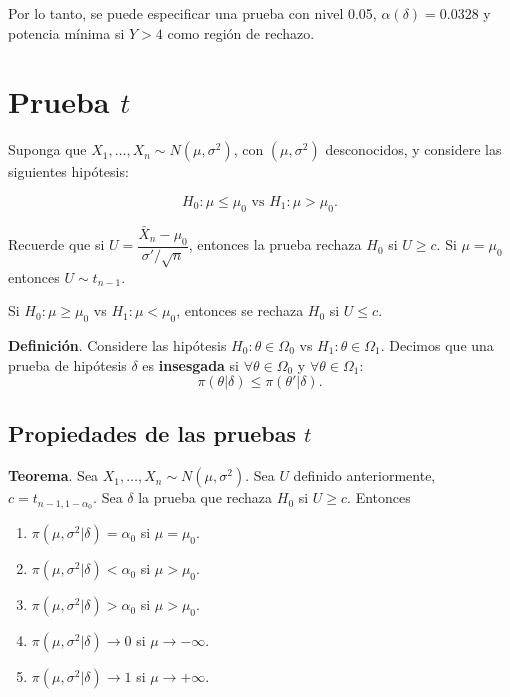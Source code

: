 \documentclass[
  12pt,
]{book}
\begin{document}
Por lo tanto, se puede especificar una prueba con nivel 0.05, \(\alpha(\delta) = 0.0328\) y potencia mínima si \(Y>4\) como región de rechazo.

\hypertarget{prueba-t}{%
\section{\texorpdfstring{Prueba \(t\)}{Prueba t}}\label{prueba-t}}

Suponga que \(X_1,\dots, X_n \sim N(\mu,\sigma^2)\), con \((\mu,\sigma^2)\) desconocidos, y considere las siguientes hipótesis:

\[H_0: \mu\leq\mu_0 \text{ vs } H_1:\mu>\mu_0.\]

Recuerde que si \(U = \dfrac{\bar X_n -\mu_0}{\sigma' /\sqrt n}\), entonces la prueba rechaza \(H_0\) si \(U\geq c\). Si \(\mu=\mu_0\) entonces \(U \sim t_{n-1}\).

Si \(H_0: \mu\geq\mu_0\) vs \(H_1: \mu<\mu_0\), entonces se rechaza \(H_0\) si \(U\leq c\).

\textbf{Definición}. Considere las hipótesis \(H_0:\theta \in \Omega_0\) vs \(H_1: \theta\in \Omega_1\). Decimos que una prueba de hipótesis \(\delta\) es \textbf{insesgada} si \(\forall \theta\in\Omega_0\) y \(\forall \theta\in \Omega_1\):
\[\pi(\theta|\delta) \leq \pi(\theta'|\delta).\]

\hypertarget{propiedades-de-las-pruebas-t}{%
\subsection{\texorpdfstring{Propiedades de las pruebas \(t\)}{Propiedades de las pruebas t}}\label{propiedades-de-las-pruebas-t}}

\textbf{Teorema}. Sea \(X_1,\dots,X_n\sim N(\mu,\sigma^2)\). Sea \(U\) definido anteriormente, \(c=t_{n-1,1-\alpha_0}\). Sea \(\delta\) la prueba que rechaza \(H_0\) si \(U\geq c\). Entonces

\begin{enumerate}
\def\labelenumi{\roman{enumi})}
\item
  \(\pi(\mu,\sigma^2|\delta) = \alpha_0\) si \(\mu=\mu_0\).
\item
  \(\pi(\mu,\sigma^2|\delta) < \alpha_0\) si \(\mu>\mu_0\).
\item
  \(\pi(\mu,\sigma^2|\delta) >\alpha_0\) si \(\mu>\mu_0\).
\item
  \(\pi(\mu,\sigma^2|\delta) \to 0\) si \(\mu\to-\infty\).
\item
  \(\pi(\mu,\sigma^2|\delta) \to 1\) si \(\mu\to+\infty\).
\end{enumerate}
\end{document}
